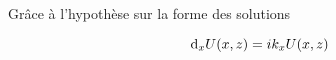 % 
% 
% 








Grâce à l'hypothèse sur la forme des solutions

\[
\mathrm{d}_{{x}} U({x},{z}) = ik_{x} U({x},{z})
\]

